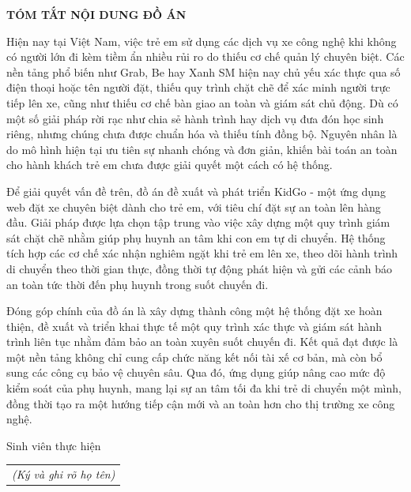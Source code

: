 \documentclass[../DoAn.tex]{subfiles}
\begin{document}
\begin{center}
    \Large{\textbf{TÓM TẮT NỘI DUNG ĐỒ ÁN}}\\
\end{center}
\vspace{1cm}
Hiện nay tại Việt Nam, việc trẻ em sử dụng các dịch vụ xe công nghệ khi không có người lớn đi kèm tiềm ẩn nhiều rủi ro do thiếu cơ chế quản lý chuyên biệt. Các nền tảng phổ biến như Grab, Be hay Xanh SM hiện nay chủ yếu xác thực qua số điện thoại hoặc tên người đặt, thiếu quy trình chặt chẽ để xác minh người trực tiếp lên xe, cũng như thiếu cơ chế bàn giao an toàn và giám sát chủ động. Dù có một số giải pháp rời rạc như chia sẻ hành trình hay dịch vụ đưa đón học sinh riêng, nhưng chúng chưa được chuẩn hóa và thiếu tính đồng bộ. Nguyên nhân là do mô hình hiện tại ưu tiên sự nhanh chóng và đơn giản, khiến bài toán an toàn cho hành khách trẻ em chưa được giải quyết một cách có hệ thống.

Để giải quyết vấn đề trên, đồ án đề xuất và phát triển KidGo - một ứng dụng web đặt xe chuyên biệt dành cho trẻ em, với tiêu chí đặt sự an toàn lên hàng đầu. Giải pháp được lựa chọn tập trung vào việc xây dựng một quy trình giám sát chặt chẽ nhằm giúp phụ huynh an tâm khi con em tự di chuyển. Hệ thống tích hợp các cơ chế xác nhận nghiêm ngặt khi trẻ em lên xe, theo dõi hành trình di chuyển theo thời gian thực, đồng thời tự động phát hiện và gửi các cảnh báo an toàn tức thời đến phụ huynh trong suốt chuyến đi.

Đóng góp chính của đồ án là xây dựng thành công một hệ thống đặt xe hoàn thiện, đề xuất và triển khai thực tế một quy trình xác thực và giám sát hành trình liên tục nhằm đảm bảo an toàn xuyên suốt chuyến đi. Kết quả đạt được là một nền tảng không chỉ cung cấp chức năng kết nối tài xế cơ bản, mà còn bổ sung các công cụ bảo vệ chuyên sâu. Qua đó, ứng dụng giúp nâng cao mức độ kiểm soát của phụ huynh, mang lại sự an tâm tối đa khi trẻ di chuyển một mình, đồng thời tạo ra một hướng tiếp cận mới và an toàn hơn cho thị trường xe công nghệ.
\begin{flushright}
    Sinh viên thực hiện\\
    \begin{tabular}{@{}c@{}}
        \textit{(Ký và ghi rõ họ tên)}
    \end{tabular}
\end{flushright}
\end{document}
